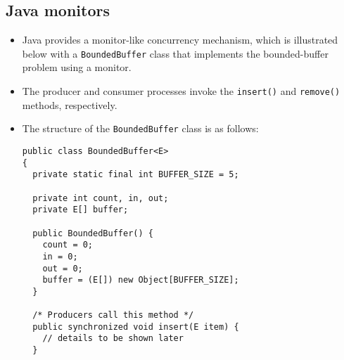 \subsection{Java monitors}
\begin{itemize}
    \item Java provides a monitor-like concurrency mechanism, which is illustrated below with a \texttt{BoundedBuffer} class that implements the bounded-buffer problem using a monitor.
    \item The producer and consumer processes invoke the \texttt{insert()} and \texttt{remove()} methods, respectively.
    \item The structure of the \texttt{BoundedBuffer} class is as follows:
    \begin{verbatim}
public class BoundedBuffer<E>
{
  private static final int BUFFER_SIZE = 5;
 
  private int count, in, out;
  private E[] buffer;
 
  public BoundedBuffer() {
    count = 0;
    in = 0;
    out = 0;
    buffer = (E[]) new Object[BUFFER_SIZE];
  }
 
  /* Producers call this method */
  public synchronized void insert(E item) {
    // details to be shown later
  }
 

\end{verbatim}
\end{itemize}
